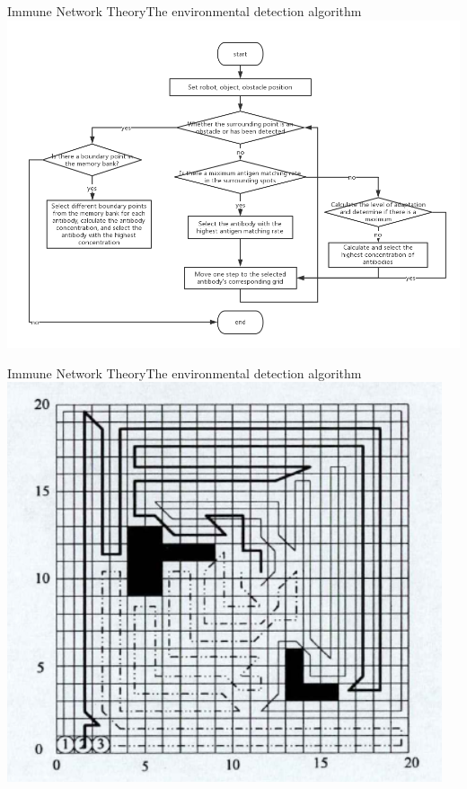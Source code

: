 \begin{frame}{Immune Network Theory}{The environmental detection algorithm}
  \centering
    \includegraphics[scale=0.30] {img/immune_network_flowchat.png}
\end{frame}

\begin{frame}{Immune Network Theory}{The environmental detection algorithm}
  \centering
    \includegraphics[scale=0.70] {img/immune_network_route_map.png}
\end{frame}


